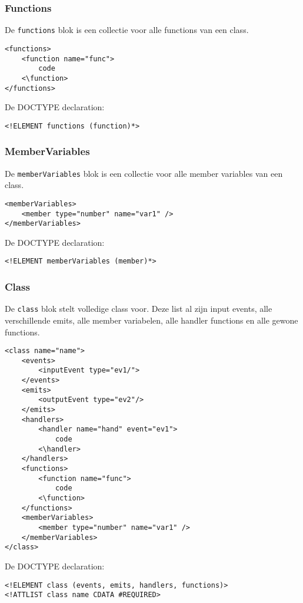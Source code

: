 \documentclass[]{article}
\begin{document}
\subsubsection{Functions}
De \texttt{functions} blok is een collectie voor alle functions van een class.
\lstset{language=XML}
\begin{lstlisting}
<functions>
	<function name="func">
		code
	<\function>
</functions>
\end{lstlisting}
De DOCTYPE declaration: 
\lstset{language=XML}
\begin{lstlisting}
<!ELEMENT functions (function)*>
\end{lstlisting}

\subsubsection{MemberVariables}
De \texttt{memberVariables} blok is een collectie voor alle member variables van een class.
\lstset{language=XML}
\begin{lstlisting}
<memberVariables>
	<member type="number" name="var1" />
</memberVariables>
\end{lstlisting}
De DOCTYPE declaration: 
\lstset{language=XML}
\begin{lstlisting}
<!ELEMENT memberVariables (member)*>
\end{lstlisting}

\subsubsection{Class}
De \texttt{class} blok stelt volledige class voor. Deze list al zijn input events, alle verschillende emits, alle member variabelen, alle handler functions en alle gewone functions.
\lstset{language=XML}
\begin{lstlisting}
<class name="name">
	<events>
		<inputEvent type="ev1/">
	</events>
	<emits>
		<outputEvent type="ev2"/>
	</emits>
	<handlers>
		<handler name="hand" event="ev1">
			code
		<\handler>
	</handlers>
	<functions>
		<function name="func">
			code
		<\function>
	</functions>
	<memberVariables>
		<member type="number" name="var1" />
	</memberVariables>
</class>
\end{lstlisting}
De DOCTYPE declaration: 
\lstset{language=XML}
\begin{lstlisting}
<!ELEMENT class (events, emits, handlers, functions)>
<!ATTLIST class name CDATA #REQUIRED>
\end{lstlisting}
\end{document}
